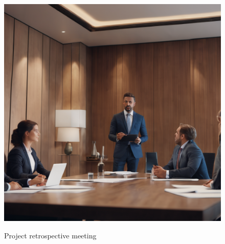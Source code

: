 \documentclass{article}
\begin{document}
\begin{figure}[H]
\caption{Project retrospective meeting}
\includegraphics[width=\textwidth]{Project retrospective.png}
\label{fig: project meeting}
\end{figure}

\end{document}
